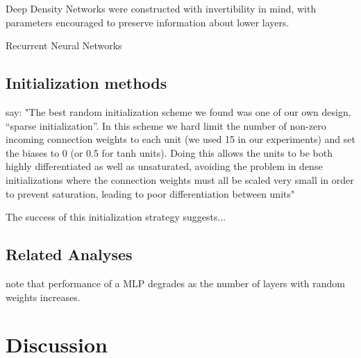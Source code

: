 \documentclass{article}
\begin{document}
Deep Density Networks \cite{rippel2013high} were constructed with invertibility in mind, with parameters encouraged to preserve information about lower layers.



Recurrent Neural Networks \cite{pascanu2012understanding}



\subsection{Initialization methods}

\cite{martens2010deep} say:  "The best random initialization scheme we found was one of our own design,
“sparse initialization”. In this scheme we hard limit the
number of non-zero incoming connection weights to each
unit (we used 15 in our experiments) and set the biases to
0 (or 0.5 for tanh units). Doing this allows the units to be
both highly differentiated as well as unsaturated, avoiding
the problem in dense initializations where the connection
weights must all be scaled very small in order to prevent
saturation, leading to poor differentiation between units"

The success of this initialization strategy suggests...



\subsection{Related Analyses}

\cite{montavon2010layer} note that performance of a MLP degrades as the number of layers with random weights increases.

\section{Discussion}
\end{document}
